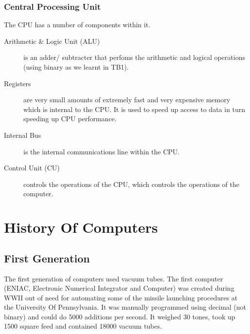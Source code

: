 \subsubsection{Central Processing Unit}
The CPU has a number of components within it.

\begin{description}
    \item[Arithmetic \& Logic Unit (ALU)] is an adder/ subtracter that perfoms the arithmetic and logical operations (using binary as we learnt in TB1).
    \item[Registers] are very small amounts of extremely fast and very expensive memory which is internal to the CPU. It is used to speed up access to data in turn speeding up CPU performance.
    \item[Internal Bus] is the internal communications line within the CPU.
    \item[Control Unit (CU)] controls the operations of the CPU, which controls the operations of the computer.  
\end{description}

\section{History Of Computers}
\subsection{First Generation}
The first generation of computers used vacuum tubes. The first computer (ENIAC, Electronic Numerical Integrator and Computer) was created during WWII out of need for automating some of the missile launching procedures at the University Of Pennsylvania. It was manually programmed using decimal (not binary) and could do 5000 additions per second. It weighed 30 tones, took up 1500 square feed and contained 18000 vacuum tubes.
